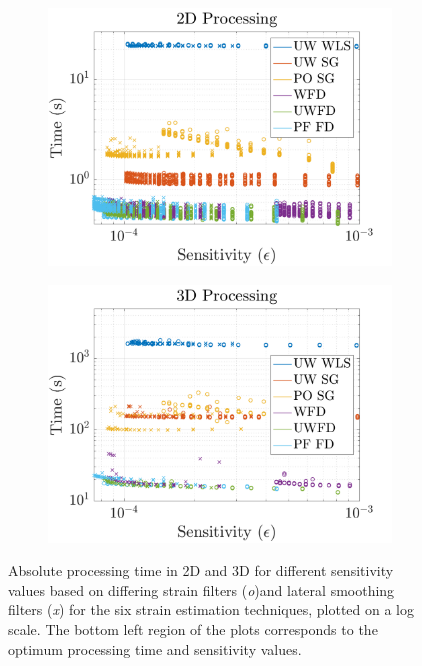 \begin{figure}[b!]
	\centering
	\begin{subfigure}{0.49\textwidth}
		\centering
		\includegraphics[width=\textwidth]{figures/sensitivity_2dtime.png}
	\end{subfigure}
	\begin{subfigure}{0.49\textwidth}
		\centering
		\includegraphics[width=\textwidth]{figures/sensitivity_3dtime.png}
	\end{subfigure}
	\caption{Absolute processing time in 2D and 3D for different sensitivity values based on differing strain filters (\textit{o})and lateral smoothing filters (\textit{x}) for the six strain estimation techniques, plotted on a log scale. The bottom left region of the plots corresponds to the optimum processing time and sensitivity values.}
	\label{sensitivity_time}
\end{figure}

